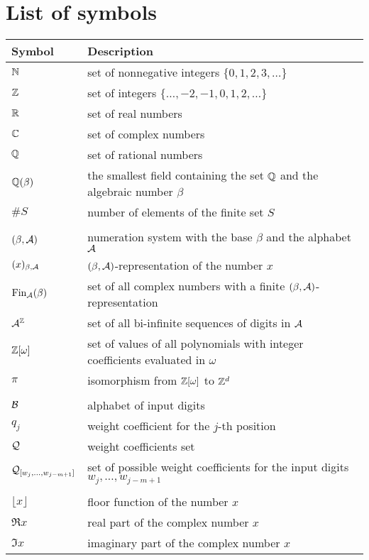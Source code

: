 \chapter*{List of symbols}
\begin{tabular}{ll}
Symbol        & Description \\ \hline
$\mathbb{N}$         & set of nonnegative integers $\{0,1,2,3,\dots\}$   \\
$\mathbb{Z}$         & set of integers $\{\dots,-2,-1,0,1,2,\dots\}$ \\
$\mathbb{R}$           & set of real numbers \\
$\mathbb{C}$           & set of complex numbers \\
$\mathbb{Q}$           &set of rational numbers \\
$\mathbb{Q}(\beta)$    &the smallest field containing the set $\mathbb{Q}$ and the algebraic number  $\beta$ \\
$\#S$          & number of elements of the finite set $S$ \\
\rule{0cm}{0cm}& \\
$(\beta,\mathcal{A})$            & numeration system with the base $\beta$ and the alphabet $\mathcal{A}$\\
$(x)_{\beta,\mathcal{A}}$    &$(\beta,\mathcal{A})$-representation of the number $x$\\
$\text{Fin}_{\mathcal{A}}(\beta)$          &set of all complex numbers with a finite $(\beta,\mathcal{A})$-representation \\
$\mathcal{A}^{\mathbb{Z}}$        &set of all bi-infinite sequences of digits in $\mathcal{A}$\\
$\mathbb{Z}[\omega]$       &set of values of all polynomials with integer coefficients evaluated in $\omega$\\
$\pi$           &isomorphism from $\mathbb{Z}[\omega]$ to $\mathbb{Z}^d$ \\
\rule{0cm}{0cm}& \\
$\mathcal{B}$            &alphabet of input digits\\
$q_j$           &weight coefficient for the $j$-th position \\
$\mathcal{Q}$            &weight coefficients set\\
$\mathcal{Q}_{[w_{j},\dots, w_{j-m+1}]}$ &set of possible weight coefficients for the input digits $w_{j},\dots, w_{j-m+1}$ \\
\rule{0cm}{0cm}& \\
$\lfloor x \rfloor$ & floor function of the number $x$ \\  
$\Re x$           & real part of the complex number $x$ \\
$\Im x$           & imaginary part of the complex number $x$
\end{tabular}